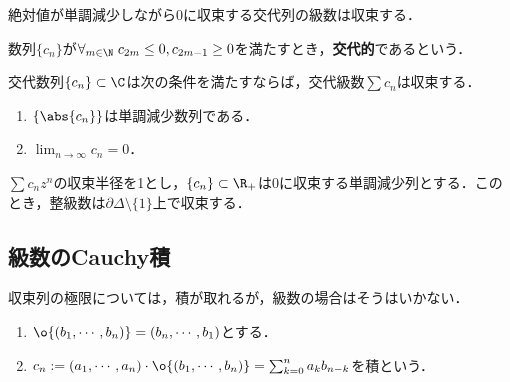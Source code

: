 \documentclass[uplatex, dvipdfmx]{jsreport}
\begin{document}
\begin{tcolorbox}[colframe=ForestGreen, colback=ForestGreen!10!white,breakable,colbacktitle=ForestGreen!40!white,coltitle=black,fonttitle=\bfseries\sffamily,
title=]
    絶対値が単調減少しながら$0$に収束する交代列の級数は収束する．
\end{tcolorbox}

\begin{definition}
    数列$\{c_n\}$が$\forall_{m\in\N}\;c_{2m}\le0,c_{2m-1}\ge0$を満たすとき，\textbf{交代的}であるという．
\end{definition}

\begin{corollary}[Leibnitz]
    交代数列$\{c_n\}\subset\C$は次の条件を満たすならば，交代級数$\sum c_n$は収束する．
    \begin{enumerate}
        \item $\{\abs{c_n}\}$は単調減少数列である．
        \item $\lim_{n\to\infty}c_n=0$．
    \end{enumerate}
\end{corollary}

\begin{corollary}
    $\sum c_nz^n$の収束半径を1とし，$\{c_n\}\subset\R_+$は$0$に収束する単調減少列とする．このとき，整級数は$\partial\Delta\setminus\{1\}$上で収束する．
\end{corollary}

\subsection{級数のCauchy積}

\begin{tcolorbox}[colframe=ForestGreen, colback=ForestGreen!10!white,breakable,colbacktitle=ForestGreen!40!white,coltitle=black,fonttitle=\bfseries\sffamily,
title=]
    収束列の極限については，積が取れるが，級数の場合はそうはいかない．
\end{tcolorbox}

\begin{definition}\mbox{}
    \begin{enumerate}
        \item $\o{(b_1,\cdots,b_n)}=(b_n,\cdots,b_1)$とする．
        \item $c_n:=(a_1,\cdots,a_n)\cdot\o{(b_1,\cdots,b_n)}=\sum_{k=0}^na_kb_{n-k}$を積という．
    \end{enumerate}
\end{definition}
\end{document}
